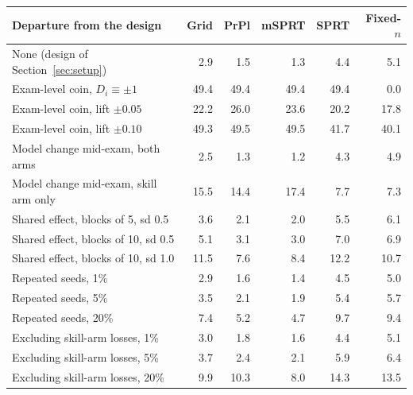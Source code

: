 \begin{tabular}{lrrrrr}
\toprule
Departure from the design & Grid & PrPl & mSPRT & SPRT & Fixed-$n$ \\
\midrule
None (design of Section~\ref{sec:setup}) & 2.9 & 1.5 & 1.3 & 4.4 & 5.1 \\
Exam-level coin, $D_i\equiv\pm1$ & 49.4 & 49.4 & 49.4 & 49.4 & 0.0 \\
Exam-level coin, lift $\pm0.05$ & 22.2 & 26.0 & 23.6 & 20.2 & 17.8 \\
Exam-level coin, lift $\pm0.10$ & 49.3 & 49.5 & 49.5 & 41.7 & 40.1 \\
Model change mid-exam, both arms & 2.5 & 1.3 & 1.2 & 4.3 & 4.9 \\
Model change mid-exam, skill arm only & 15.5 & 14.4 & 17.4 & 7.7 & 7.3 \\
Shared effect, blocks of 5, sd 0.5 & 3.6 & 2.1 & 2.0 & 5.5 & 6.1 \\
Shared effect, blocks of 10, sd 0.5 & 5.1 & 3.1 & 3.0 & 7.0 & 6.9 \\
Shared effect, blocks of 10, sd 1.0 & 11.5 & 7.6 & 8.4 & 12.2 & 10.7 \\
Repeated seeds, 1\% & 2.9 & 1.6 & 1.4 & 4.5 & 5.0 \\
Repeated seeds, 5\% & 3.5 & 2.1 & 1.9 & 5.4 & 5.7 \\
Repeated seeds, 20\% & 7.4 & 5.2 & 4.7 & 9.7 & 9.4 \\
Excluding skill-arm losses, 1\% & 3.0 & 1.8 & 1.6 & 4.4 & 5.1 \\
Excluding skill-arm losses, 5\% & 3.7 & 2.4 & 2.1 & 5.9 & 6.4 \\
Excluding skill-arm losses, 20\% & 9.9 & 10.3 & 8.0 & 14.3 & 13.5 \\
\bottomrule
\end{tabular}
